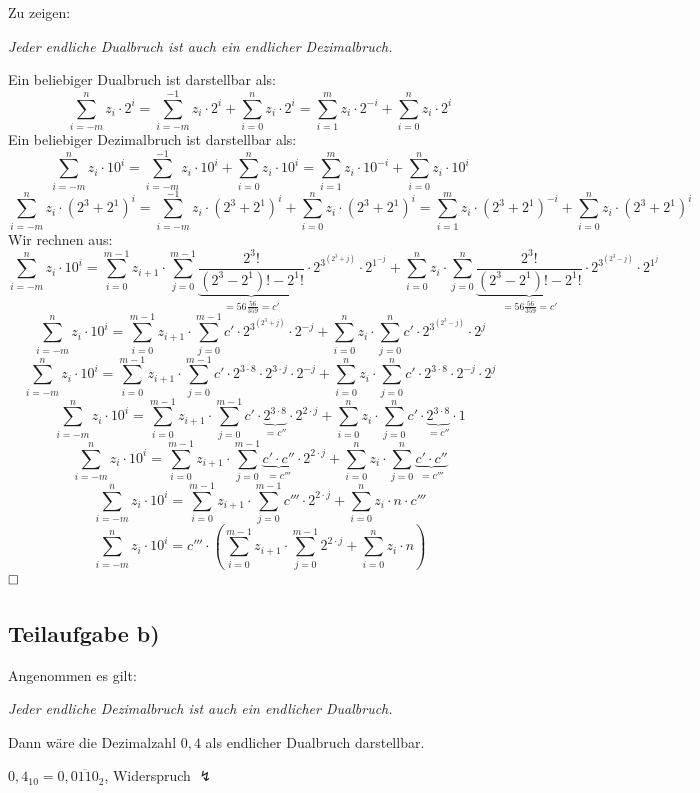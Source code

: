 \documentclass{llncs}
\begin{document}
Zu zeigen: 
\begin{center}
\textit{Jeder endliche Dualbruch ist auch ein endlicher Dezimalbruch.}
\end{center}
Ein beliebiger Dualbruch ist darstellbar als:
$$\sum_{i=-m}^{n} z_{i} \cdot 2^{i} = \sum_{i=-m}^{-1} z_{i} \cdot 2^{i} + \sum_{i=0}^{n} z_{i} \cdot 2^{i} = \sum_{i=1}^{m} z_{i} \cdot 2^{-i} + \sum_{i=0}^{n} z_{i} \cdot 2^{i}$$ 
Ein beliebiger Dezimalbruch ist darstellbar als:
$$\sum_{i=-m}^{n} z_{i} \cdot 10^{i} = \sum_{i=-m}^{-1} z_{i} \cdot 10^{i} + \sum_{i=0}^{n} z_{i} \cdot 10^{i} = \sum_{i=1}^{m} z_{i} \cdot 10^{-i} + \sum_{i=0}^{n} z_{i} \cdot 10^{i}$$ 
$$\sum_{i=-m}^{n} z_{i} \cdot (2^3+2^1)^{i} = \sum_{i=-m}^{-1} z_{i} \cdot (2^3+2^1)^{i} + \sum_{i=0}^{n} z_{i} \cdot (2^3+2^1)^{i} = \sum_{i=1}^{m} z_{i} \cdot (2^3+2^1)^{-i} + \sum_{i=0}^{n} z_{i} \cdot (2^3+2^1)^{i}$$
Wir rechnen aus:
$$\sum_{i=-m}^{n} z_{i} \cdot 10^{i} =\sum_{i=0}^{m-1} z_{i+1} \cdot \sum_{j=0}^{m-1} \underbrace{\frac{2^3!}{(2^3-2^1)!-2^1!}}_{=56\frac{56}{359}=c'} \cdot 2^{3^{(2^3+j)}} \cdot 2^{1^{-j}} + \sum_{i=0}^{n} z_{i} \cdot \sum_{j=0}^{n} \underbrace{\frac{2^3!}{(2^3-2^1)!-2^1!}}_{=56\frac{56}{359}=c'} \cdot 2^{3^{(2^3-j)}} \cdot 2^{1^{j}}$$
$$\sum_{i=-m}^{n} z_{i} \cdot 10^{i} =\sum_{i=0}^{m-1} z_{i+1} \cdot \sum_{j=0}^{m-1} c' \cdot 2^{3^{(2^3+j)}} \cdot 2^{-j} + \sum_{i=0}^{n} z_{i} \cdot \sum_{j=0}^{n} c' \cdot 2^{3^{(2^3-j)}} \cdot 2^{j}$$
$$\sum_{i=-m}^{n} z_{i} \cdot 10^{i} =\sum_{i=0}^{m-1} z_{i+1} \cdot \sum_{j=0}^{m-1} c' \cdot 2^{3 \cdot 8} \cdot 2^{3 \cdot j} \cdot 2^{-j} + \sum_{i=0}^{n} z_{i} \cdot \sum_{j=0}^{n} c' \cdot 2^{3 \cdot 8} \cdot 2^{-j} \cdot 2^{j}$$
$$\sum_{i=-m}^{n} z_{i} \cdot 10^{i} =\sum_{i=0}^{m-1} z_{i+1} \cdot \sum_{j=0}^{m-1} c' \cdot \underbrace{2^{3 \cdot 8}}_{= c''} \cdot 2^{2 \cdot j} + \sum_{i=0}^{n} z_{i} \cdot \sum_{j=0}^{n} c' \cdot \underbrace{2^{3 \cdot 8}}_{= c''} \cdot 1$$
$$\sum_{i=-m}^{n} z_{i} \cdot 10^{i} =\sum_{i=0}^{m-1} z_{i+1} \cdot \sum_{j=0}^{m-1} \underbrace{c' \cdot c''}_{=c'''} \cdot 2^{2 \cdot j} + \sum_{i=0}^{n} z_{i} \cdot \sum_{j=0}^{n} \underbrace{c' \cdot c''}_{=c'''}$$
$$\sum_{i=-m}^{n} z_{i} \cdot 10^{i} =\sum_{i=0}^{m-1} z_{i+1} \cdot \sum_{j=0}^{m-1} c''' \cdot 2^{2 \cdot j} + \sum_{i=0}^{n} z_{i} \cdot n \cdot c'''$$
$$\sum_{i=-m}^{n} z_{i} \cdot 10^{i} = c''' \cdot \left(\sum_{i=0}^{m-1} z_{i+1} \cdot \sum_{j=0}^{m-1} 2^{2 \cdot j} + \sum_{i=0}^{n} z_{i} \cdot n\right)$$
$\hfill \square$
\subsection*{Teilaufgabe b)}

Angenommen es gilt:
\begin{center}
\textit{Jeder endliche Dezimalbruch ist auch ein endlicher Dualbruch.}
\end{center}
Dann w\"are die Dezimalzahl $0,4$ als endlicher Dualbruch darstellbar.
\begin{center}
$0,4_{10} = 0,\overline{0110}_2$, Widerspruch $\lightning$
\end{center}
\end{document}
